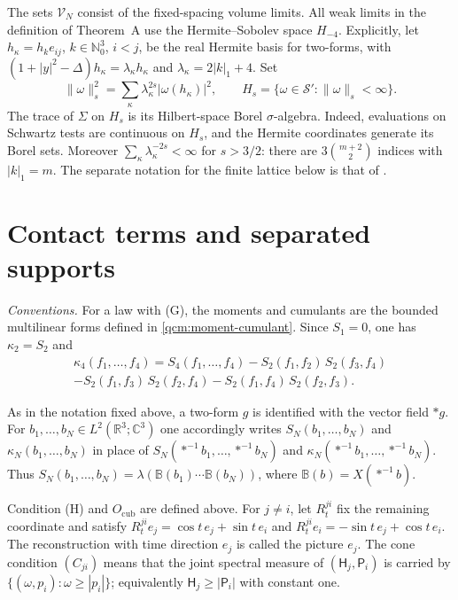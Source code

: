 \documentclass[11pt,letterpaper,reqno]{amsart}
\theoremstyle{definition}
\begin{document}
The sets $\mathcal V_N$ consist of the fixed-spacing volume limits.
All weak limits in the definition of Theorem~A use the
Hermite--Sobolev space $H_{-4}$. Explicitly, let
$h_\kappa=h_k e_{ij}$, $k\in\mathbb N_0^3$, $i<j$, be the real
Hermite basis for two-forms, with
$(1+|y|^2-\Delta)h_\kappa=\lambda_\kappa h_\kappa$ and
$\lambda_\kappa=2|k|_1+4$. Set
\begin{equation}\label{qcm:hermite-spaces}
 \|\omega\|_s^2=\sum_\kappa\lambda_\kappa^{2s}
                       |\omega(h_\kappa)|^2,
 \qquad H_s=\{\omega\in\mathcal S':\|\omega\|_s<\infty\}.
\end{equation}
The trace of $\Sigma$ on $H_s$ is its Hilbert-space Borel
$\sigma$-algebra. Indeed, evaluations on Schwartz tests are continuous
on $H_s$, and the Hermite coordinates generate its Borel sets.
Moreover $\sum_\kappa\lambda_\kappa^{-2s}<\infty$ for $s>3/2$:
there are $3\binom{m+2}{2}$ indices with $|k|_1=m$.
The separate notation for the finite lattice below is that of
\cite[Sections~2--4]{QEDConstruction}.


\section{Contact terms and separated supports}

\emph{Conventions.}
For a law with (G), the moments and cumulants are the bounded
multilinear forms defined in \eqref{qcm:moment-cumulant}.
Since $S_1=0$, one has $\kappa_2=S_2$ and
\begin{multline*}
\kappa_4(f_1,\dots,f_4)=S_4(f_1,\dots,f_4)-S_2(f_1,f_2)\,S_2(f_3,f_4)\\
-S_2(f_1,f_3)\,S_2(f_2,f_4)-S_2(f_1,f_4)\,S_2(f_2,f_3).
\end{multline*}

As in the notation fixed above, a two-form $g$ is identified with the vector field $\ast g$.
For $b_1,\dots,b_N\in L^2(\mathbb{R}^3;\mathbb{C}^3)$ one accordingly writes $S_N(b_1,\dots,b_N)$ and $\kappa_N(b_1,\dots,b_N)$ in place of $S_N(\ast^{-1}b_1,\dots,\ast^{-1}b_N)$ and $\kappa_N(\ast^{-1}b_1,\dots,\ast^{-1}b_N)$.
Thus $S_N(b_1,\ldots,b_N)=\lambda(\mathbb B(b_1)\cdots\mathbb B(b_N))$, where $\mathbb B(b)=X(\ast^{-1}b)$.

Condition (H) and $O_{\mathrm{cub}}$ are defined above.
For $j\ne i$, let $R^{ji}_t$ fix the remaining coordinate and satisfy $R^{ji}_te_j=\cos t\,e_j+\sin t\,e_i$ and $R^{ji}_te_i=-\sin t\,e_j+\cos t\,e_i$. The reconstruction with time direction $e_j$ is called the picture $e_j$.
The cone condition $(C_{ji})$ means that the joint spectral measure of $(\mathsf H_j,\mathsf P_i)$ is carried by $\{(\omega,p_i):\omega\ge|p_i|\}$; equivalently $\mathsf H_j\ge|\mathsf P_i|$ with constant one.
\end{document}
